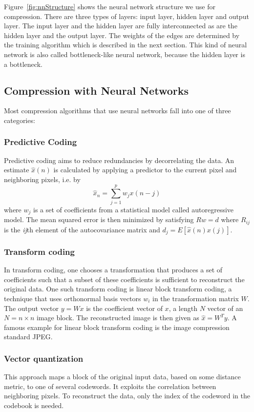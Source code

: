 Figure~\ref{fig:nnStructure} shows the neural network structure we use for compression. There are three types of layers: input layer, hidden layer and output layer. The input layer and the hidden layer are fully interconnected as are the hidden layer and the output layer. The weights of the edges are determined by the training algorithm which is described in the next section. This kind of neural network is also called bottleneck-like neural network, because the hidden layer is a bottleneck.

\subsection{Compression with Neural Networks}
Most compression algorithms that use neural networks fall into one of three categories\cite{Dony1995}: 

\subsubsection{Predictive Coding}
Predictive coding aims to reduce redundancies by decorrelating the data. An estimate \(\hat{x}(n)\) is calculated by applying a predictor to the current pixel and neighboring pixels, i.e. by
\begin{equation}
\hat{x}_n = \sum_{j=1}^{p} w_j x(n-j)
\end{equation}
where \({w_j}\) is a set of coefficients from a statistical model called autoregressive model. The mean squared error is then minimized by satisfying \(Rw = d\) where \(R_{ij}\) is the \emph{ij}th element of the autocovariance matrix and \(d_j = E[\hat{x}(n)x(j)]\).

\subsubsection{Transform coding}
In transform coding, one chooses a transformation that produces a set of coefficients such that a subset of these coefficients is sufficient to reconstruct the original data. One such transform coding is linear block transform coding, a technique that uses orthonormal basis vectors \(w_i\) in the transformation matrix \(W\). The output vector \(y = Wx\) is the coefficient vector of \(x\), a length \(N\) vector of an \(N = n \times n\) image block. The reconstructed image is then given as \(\hat{x} = W^Ty\). 
A famous example for linear block transform coding is the image compression standard JPEG.

\subsubsection{Vector quantization}
This approach maps a block of the original input data, based on some distance metric, to one of several codewords. It exploits the correlation between neighboring pixels. To reconstruct the data, only the index of the codeword in the codebook is needed. 

